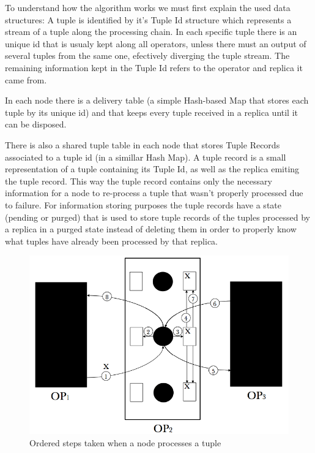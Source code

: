\documentclass[times, 10pt,twocolumn]{article}
\begin{document}


To understand how the
algorithm works we must first explain the used data structures: A tuple is
identified by it's Tuple Id structure which represents a stream of a tuple
along the processing chain. In each specific tuple there is an unique id
that is usualy kept along all operators, unless there must an output of
several tuples from the same one, efectively diverging the tuple stream.
The remaining information kept in the Tuple Id refers to the operator and
replica it came from. 

In each node there is a delivery table (a simple
Hash-based Map that stores each tuple by its unique id) and that keeps
every tuple received in a replica until it can be disposed.  

There is
also a shared tuple table in each node that stores Tuple Records
associated to a tuple id (in a simillar Hash Map). A tuple record is a
small representation of a tuple containing its Tuple Id, as well as the
replica emiting the tuple record. This way the tuple record contains only
the necessary information for a node to re-process a tuple that wasn't
properly processed due to failure. For information storing purposes the
tuple records have a state (pending or purged) that is used to store
tuple records of the tuples processed by a replica in a purged state
instead of deleting them in order to properly know what tuples have
already been processed by that replica.



\begin{figure}[h] 
	\includegraphics[width=\columnwidth]{semantics}
	\caption{Ordered steps taken when a node processes a tuple}
\end{figure}
\end{document}
